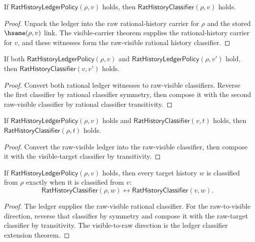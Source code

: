 \begin{theorem}
\label{thm:rat-ledger-raw-visible-classifier}
If $\mathsf{RatHistoryLedgerPolicy}(\rho,v)$ holds, then
$\mathsf{RatHistoryClassifier}(\rho,v)$ holds.
\end{theorem}
\begin{proof}
Unpack the ledger into the raw rational-history carrier for $\rho$ and the
stored $\hsame(\rho,v)$ link. The visible-carrier theorem supplies the
rational-history carrier for $v$, and these witnesses form the raw-visible
rational history classifier.
\end{proof}

\begin{theorem}
\label{thm:rat-history-ledger-policy-shared-raw-visible-classifier}
If both $\mathsf{RatHistoryLedgerPolicy}(\rho,v)$ and
$\mathsf{RatHistoryLedgerPolicy}(\rho,v')$ hold, then
$\mathsf{RatHistoryClassifier}(v,v')$ holds.
\end{theorem}
\begin{proof}
Convert both rational ledger witnesses to raw-visible classifiers. Reverse the
first classifier by rational classifier symmetry, then compose it with the
second raw-visible classifier by rational classifier transitivity.
\end{proof}

\begin{theorem}
\label{thm:rat-ledger-classifier-extension}
If $\mathsf{RatHistoryLedgerPolicy}(\rho,v)$ holds and
$\mathsf{RatHistoryClassifier}(v,t)$ holds, then
$\mathsf{RatHistoryClassifier}(\rho,t)$ holds.
\end{theorem}
\begin{proof}
Convert the raw-visible ledger into the raw-visible classifier, then compose it
with the visible-target classifier by transitivity.
\end{proof}

\begin{theorem}
\label{thm:rat-history-ledger-classifier-endpoint-equivalence}
If $\mathsf{RatHistoryLedgerPolicy}(\rho,v)$ holds, then every target history
$w$ is classified from $\rho$ exactly when it is classified from $v$:
$$
\mathsf{RatHistoryClassifier}(\rho,w)\leftrightarrow
\mathsf{RatHistoryClassifier}(v,w).
$$
\end{theorem}
\begin{proof}
The ledger supplies the raw-visible rational classifier. For the raw-to-visible
direction, reverse that classifier by symmetry and compose it with the
raw-target classifier by transitivity. The visible-to-raw direction is the
ledger classifier extension theorem.
\end{proof}

